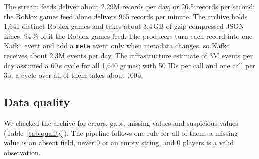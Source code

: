 \documentclass[10pt,a4paper]{article}
\newcommand{\ep}[1]{\texttt{\small #1}}
\begin{document}
The stream feeds deliver about 2.29M records per day, or 26.5 records per second; the Roblox games feed alone delivers 965 records per minute. The archive holds 1,641 distinct Roblox games and takes about 3.4\,GB of gzip-compressed JSON Lines, 94\,\% of it the Roblox games feed. The producers turn each record into one Kafka event and add a \ep{meta} event only when metadata changes, so Kafka receives about 2.3M events per day. The infrastructure estimate of 3M events per day assumed a 60\,s cycle for all 1,640 games; with 50 IDs per call and one call per 3\,s, a cycle over all of them takes about 100\,s.

\subsection{Data quality}\label{sec:quality}
We checked the archive for errors, gaps, missing values and suspicious values (Table~\ref{tab:quality}). The pipeline follows one rule for all of them: a missing value is an absent field, never 0 or an empty string, and 0 players is a valid observation.
\end{document}
